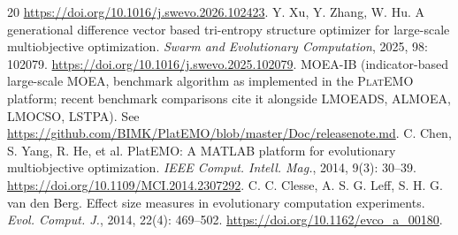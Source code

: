 \documentclass[preprint,12pt]{elsarticle}
\begin{document}
\begin{thebibliography}{20}
\newblock \url{https://doi.org/10.1016/j.swevo.2026.102423}.
Y. Xu, Y. Zhang, W. Hu.
\newblock A generational difference vector based tri-entropy structure
optimizer for large-scale multiobjective optimization.
\newblock \emph{Swarm and Evolutionary Computation}, 2025, 98: 102079.
\newblock \url{https://doi.org/10.1016/j.swevo.2025.102079}.
\textsc{MOEA-IB} (indicator-based large-scale MOEA, benchmark algorithm as
implemented in the \textsc{PlatEMO} platform; recent benchmark comparisons
cite it alongside \textsc{LMOEADS}, \textsc{ALMOEA}, \textsc{LMOCSO},
\textsc{LSTPA}).
\newblock See \url{https://github.com/BIMK/PlatEMO/blob/master/Doc/releasenote.md}.
C. Chen, S. Yang, R. He, et al.
\newblock PlatEMO: A MATLAB platform for evolutionary multiobjective
optimization.
\newblock \emph{IEEE Comput. Intell. Mag.}, 2014, 9(3): 30--39.
\newblock \url{https://doi.org/10.1109/MCI.2014.2307292}.
C. C. Clesse, A. S. G. Leff, S. H. G. van den Berg.
\newblock Effect size measures in evolutionary computation experiments.
\newblock \emph{Evol. Comput. J.}, 2014, 22(4): 469--502.
\newblock \url{https://doi.org/10.1162/evco_a_00180}.
\end{thebibliography}
\end{document}
